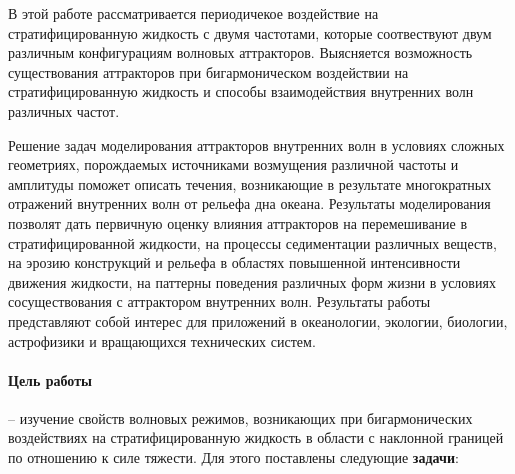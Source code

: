 \documentclass[utf8x]{G7-32} %
\begin{document}
В этой работе рассматривается периодичекое воздействие на стратифицированную жидкость с двумя частотами, которые соотвествуют двум различным конфигурациям волновых аттракторов. Выясняется возможность существования аттракторов при бигармоническом воздействии на стратифицированную жидкость и способы взаимодействия внутренних волн различных частот. 

Решение задач моделирования аттракторов внутренних волн в условиях сложных геометриях, порождаемых источниками возмущения различной частоты и амплитуды поможет описать течения, возникающие в результате многократных отражений внутренних волн от рельефа дна океана. Результаты моделирования позволят дать первичную оценку влияния аттракторов на перемешивание в стратифицированной жидкости, на процессы седиментации различных веществ, на эрозию конструкций и рельефа в областях повышенной интенсивности движения жидкости, на паттерны поведения различных форм жизни в условиях сосуществования с аттрактором внутренних волн. Результаты работы представляют собой интерес для приложений в океанологии, экологии, биологии, астрофизики и вращающихся технических систем. 

\paragraph{Цель работы} -- изучение свойств волновых режимов, возникающих при бигармонических воздействиях на стратифицированную жидкость в области с наклонной границей по отношению к силе тяжести.
Для этого поставлены следующие \textbf{задачи}:
\end{document}
